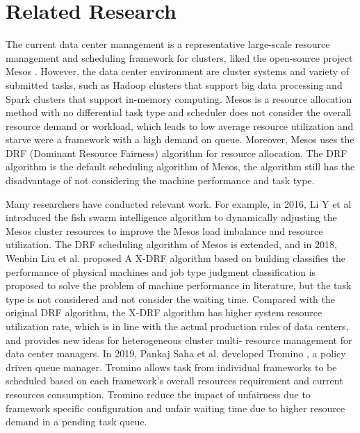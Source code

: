 \documentclass[12pt,oneside,openright,a4paper]{cpe-english-project}
\begin{document}
\section{Related Research}
The current data center management is a representative large-scale resource management and scheduling framework for clusters, liked the open-source project Mesos \cite{mesosInAction}. However, the data center environment are cluster systems and variety of submitted tasks, such as Hadoop clusters that support big data processing and Spark clusters that support in-memory computing. Mesos is a resource allocation method with no differential task type and scheduler does not consider the overall resource demand or workload, which leads to low average resource utilization and starve were a framework with a high demand on queue. Moreover, Mesos uses the DRF (Dominant Resource Fairness) algorithm for resource allocation. The DRF algorithm is the default scheduling algorithm of Mesos, the algorithm still has the disadvantage of not considering the machine performance and task type.

Many researchers have conducted relevant work. For example, in 2016, Li Y et al \cite{fishSwarm} introduced the fish swarm intelligence algorithm to dynamically adjusting the Mesos cluster resources to improve the Mesos load imbalance and resource utilization. The DRF scheduling algorithm of Mesos is extended, and in 2018, Wenbin Liu et al. proposed A X-DRF algorithm \cite{xdrf} based on building classifies the performance of physical machines and job type judgment classification is proposed to solve the problem of machine performance in literature, but the task type is not considered and not consider the waiting time. Compared with the original DRF algorithm, the X-DRF algorithm has higher system resource utilization rate, which is in line with the actual production rules of data centers, and provides new ideas for heterogeneous cluster multi- resource management for data center managers. In 2019, Pankaj Saha et al. developed Tromino \cite{tromino}, a policy driven queue manager. Tromino allows task from individual frameworks to be scheduled based on each framework’s overall resources requirement and current resources consumption. Tromino reduce the impact of unfairness due to framework specific configuration and unfair waiting time due to higher resource demand in a pending task queue.

\end{document}
